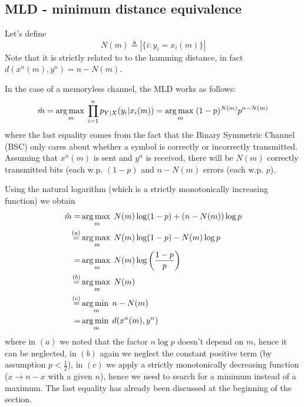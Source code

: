 
\subsection{MLD - minimum distance equivalence}
Let's define
%
\begin{equation}
N(m) \triangleq \left|\{ i: y_i=x_i(m) \} \right|
\end{equation}
%
Note that it is strictly related to to the hamming distance, in fact $d(x^n(m),y^n) = n-N(m)$.

In the case of a memoryless channel, the MLD works as follows:
%
\begin{equation}
\hat{m} = \operatorname*{arg\,max\;}_m \prod_{i=1}^{n} p_{Y|X}(y_i|x_i(m)) = \operatorname*{arg\,max\;}_m (1-p)^{N(m)} p^{n-N(m)}
\end{equation}
%
where the last equality comes from the fact that the Binary Symmetric Channel (BSC) only cares about whether a symbol is correctly or incorrectly transmitted. Assuming that $x^n(m)$ is sent and $y^n$ is received, there will be $N(m)$ correctly transmitted bits (each w.p. $(1-p)$ and $n-N(m)$ errors (each w.p. $p$).

Using the natural logarithm (which is a strictly monotonically increasing function) we obtain
%
\begin{align}
\begin{split}
\hat{m} =& \operatorname*{arg\,max\;}_m N(m)\log(1-p) + (n-N(m)) \log p\\
\stackrel{(a)}{=}& \operatorname*{arg\,max\;}_m N(m)\log(1-p) -N(m) \log p\\
=& \operatorname*{arg\,max\;}_m N(m)\log\left( \frac{1-p}{p} \right)\\
\stackrel{(b)}{=}& \operatorname*{arg\,max\;}_m N(m)\\
\stackrel{(c)}{=}& \operatorname*{arg\,min\;}_m n-N(m)\\
=& \operatorname*{arg\,min\;}_m d( x^n(m),y^n)
\end{split}
\end{align}
%
where in $(a)$ we noted that the factor $n \log p$ doesn't depend on $m$, hence it can be neglected, in $(b)$ again we neglect the constant positive term (by assumption $p<\frac{1}{2}$), in $(c)$ we apply a strictly monotonically decreasing function ($x \rightarrow n-x$ with a given $n$), hence we need to search for a minimum instead of a maximum. The last equality has already been discussed at the beginning of the section.

